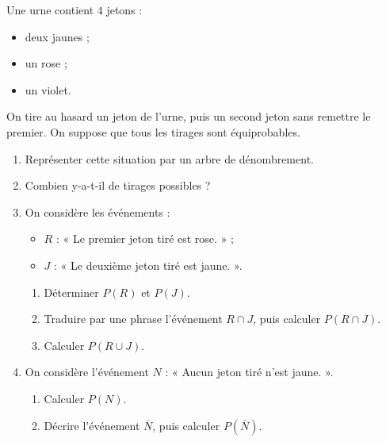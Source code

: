 \documentclass[11pt]{article}
\begin{document}
\begin{exo}
  Une urne contient $4$ jetons :
\begin{itemize}
  \item deux jaunes ;
  \item un rose ;
  \item un violet.
\end{itemize}
On tire au hasard un jeton de l'urne, puis un second jeton sans remettre le
premier. On suppose que tous les tirages sont équiprobables.
\begin{enumerate}
  \item Représenter cette situation par un arbre de dénombrement.
  \item Combien y-a-t-il de tirages possibles ?
  \item On considère les événements :
    \begin{itemize}
      \item $R$ : « Le premier jeton tiré est rose. » ;
      \item $J$ : « Le deuxième jeton tiré est jaune. ».
    \end{itemize}
    \begin{enumerate}
      \item Déterminer $P(R)$ et $P(J)$.
      \item Traduire par une phrase l'événement $R\cap J$, puis calculer
        $P(R\cap J)$.
      \item Calculer $P(R\cup J)$.
    \end{enumerate}
  \item On considère l'événement $N$ : « Aucun jeton tiré n'est jaune. ».
    \begin{enumerate}
      \item Calculer $P(N)$.
      \item Décrire l'événement $\overline N$, puis calculer $P\left( \overline
        N\right)$.
    \end{enumerate}
\end{enumerate}
\end{exo}
\end{document}
